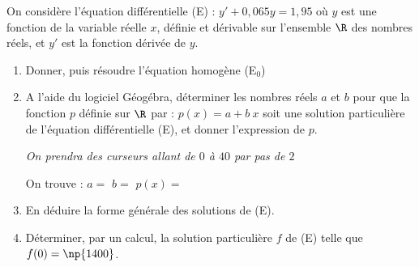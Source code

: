 On considère l’équation différentielle (E) : $y' + 0,065y = 1,95$ où $y$ est une fonction de la variable réelle $x$, définie et dérivable sur l’ensemble $\R$ des nombres réels, et $y'$ est la fonction dérivée de $y$.

\begin{enumerate}
	\item Donner, puis résoudre l'équation homogène (E$_0$)\sautp

	\item A l’aide du logiciel Géogébra, déterminer les nombres réels $a$ et $b$ pour que la fonction $p$ définie sur $\R$ par : $p(x) = a + b~x$ soit une solution particulière de l'équation différentielle (E), et donner l’expression de $p$. 
	
	{\it On prendra des curseurs allant de $0$ à $40$ par pas de $2$}\sautm
	
	On trouve : $a=$\makebox[0.1\linewidth]{\dotfill} \hfill $b=$\makebox[0.1\linewidth]{\dotfill} \hfill $p(x)=$\makebox[0.3\linewidth]{\dotfill}\sauts
	
	\appelprof

	\item En déduire la forme générale des solutions de (E).\sautp

	\item Déterminer, par un calcul, la solution particulière $f$ de (E) telle que $f(0)=\np{1400}$.\sautp

\end{enumerate}